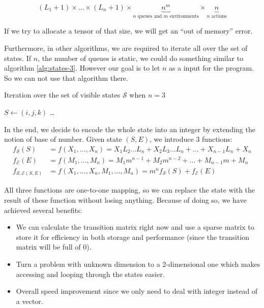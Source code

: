 \documentclass[
  a4paper, xcolor = usenames,dvipsnames]{article}
\providecommand{\tightlist}{%
  \setlength{\itemsep}{0pt}\setlength{\parskip}{0pt}}
\begin{document}
\[
(L_{1} + 1) \times \dots \times (L_{n} + 1) \times \underbrace{n^{m}}_{n \text{ queues and } m \text{ environments}} \times \underbrace{n}_{n \text{ actions}}
\]

If we try to allocate a tensor of that size, we will get an ``out of memory'' error.

Furthermore, in other algorithms, we are required to iterate all over the set of states. If \(n\), the number of queues is static, we could do something similar to algorithm \ref{alg:states-3}. However our goal is to let \(n\) as a input for the program. So we can not use that algorithm there.

\begin{algorithm}
\caption{Iteration over the set of visible states $\mathcal{S}$ when $n = 3$} \label{alg:states-3}
 {
   {
     {
      $S \gets (i, j, k)$\;
      \dots\;
    }
  }
}
\end{algorithm}

In the end, we decide to encode the whole state into an integer by extending the notion of base of number. Given state \((S, E)\), we introduce 3 functions:
\[
\begin{aligned}
f_{\mathcal{S}}(S) &= f(X_{1}, \dots, X_{n}) = X_{1} L_{2} \dots L_{n} + X_{2} L_{3} \dots L_{n} + \dots + X_{n - 1} L_{n} + X_{n} \\
f_{\mathcal{E}}(E) &= f(M_{1}, \dots, M_{n}) = M_{1} m^{n - 1} + M_{2} m^{n - 2} + \dots + M_{n - 1} m + M_{n} \\
f_{\mathcal{S, E}(S, E)} &= f(X_{1}, \dots, X_{n}, M_{1}, \dots, M_{n}) = m^{n} f_{\mathcal{S}}(S) + f_{\mathcal{E}}(E)
\end{aligned}
\]

All three functions are one-to-one mapping, so we can replace the state with the result of these function without losing anything. Because of doing so, we have achieved several benefits:

\begin{itemize}
\tightlist
\item
  We can calculate the transition matrix right now and use a sparse matrix to store it for efficiency in both storage and performance (since the transition matrix will be full of 0).
\item
  Turn a problem with unknown dimension to a 2-dimensional one which makes accessing and looping through the states easier.
\item
  Overall speed improvement since we only need to deal with integer instead of a vector.
\end{itemize}
\end{document}
